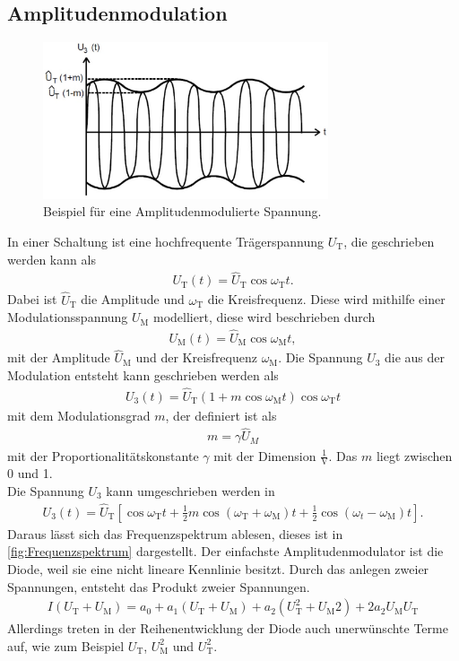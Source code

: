 \subsection{Amplitudenmodulation}
\begin{figure}[h!]
	\centering
	\includegraphics[width = 0.75\textwidth]{../Grafiken/Frequenzbaender.pdf}
	\caption{Beispiel für eine Amplitudenmodulierte Spannung.\cite{V59}\label{fig:modulationsgrad_amplitude}}
\end{figure}
In einer Schaltung ist eine hochfrequente Trägerspannung $U_\text{T}$, die geschrieben werden kann als
\begin{align}
	U_\text{T}(t)=\hat U_\text{T}\cos\omega_\text{T}t.
\end{align}
Dabei ist $\hat U_\text{T}$ die Amplitude und $\omega_\text{T}$ die Kreisfrequenz.
Diese wird mithilfe einer Modulationsspannung $U_\text{M}$ modelliert, diese wird beschrieben durch
\begin{align}
	U_\text{M}(t)=\hat U_\text{M}\cos\omega_\text{M}t,
\end{align}
mit der Amplitude $\hat U_\text{M}$ und der Kreisfrequenz $\omega_\text{M}$.
Die Spannung $U_3$ die aus der Modulation entsteht kann geschrieben werden als
\begin{align}
	U_3(t)=\hat U_\text{T}\left(1+m\cos\omega_\text{M}t\right)\cos \omega_\text{T}t
\end{align}
mit dem Modulationsgrad $m$, der definiert ist als 
\begin{align}
	m = \gamma \hat U_M
\end{align}
mit der Proportionalitätskonstante $\gamma$ mit der Dimension $\frac{1}{\text{V}}$.
Das $m$ liegt zwischen 0 und 1.\\
Die Spannung $U_3$ kann umgeschrieben werden in
\begin{align}
	U_3(t)=\hat U_\text{T} \left[\cos\omega_\text{T}t+\frac{1}{2}m\cos\left(\omega_\text{T}+\omega_\text{M}\right)t+\frac{1}{2}\cos\left(\omega_t-\omega_\text{M}\right)t\right].
\end{align}
Daraus lässt sich das Frequenzspektrum ablesen, dieses ist in \cref{fig:Frequenzspektrum} dargestellt.
Der einfachste Amplitudenmodulator ist die Diode, weil sie eine nicht lineare Kennlinie besitzt.
Durch das anlegen zweier Spannungen, entsteht das Produkt zweier Spannungen. 
\begin{align}
	I(U_\text{T}+U_\text{M})=a_0+a_1(U_\text{T}+U_\text{M})+a_2\left(U_\text{T}^2+U_\text{M} 2\right)+2a_2U_\text{M}U_\text{T}
\end{align}
Allerdings treten in der Reihenentwicklung der Diode auch unerwünschte Terme auf, wie zum Beispiel $U_\text{T}$, $U_\text{M}^2$ und $U_\text{T}^2$.

